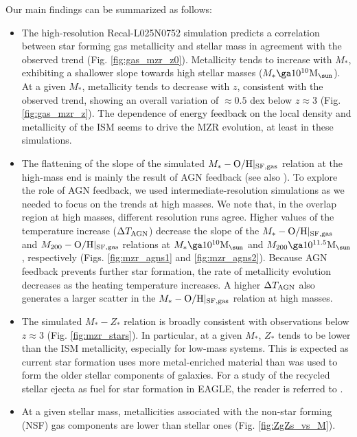 \documentclass[useAMS,usenatbib]{mn2e}
\begin{document}
Our main findings can be summarized as follows:

\begin{itemize}
\item The high-resolution Recal-L025N0752 simulation predicts a correlation between
star forming gas metallicity and stellar mass in 
agreement with the observed trend (Fig. \ref{fig:gas_mzr_z0}).  
Metallicity tends to increase with
$M_*$, exhibiting a shallower slope towards high stellar masses ($M_* \ga 10^{10} {\rm M}_{\sun}$). 
At a given $M_*$, metallicity tends to decrease with $z$, consistent with the observed
trend, showing an overall variation of $\approx 0.5$ dex below $z\approx 3$ (Fig. \ref{fig:gas_mzr_z}).
The dependence of energy feedback on the local density and metallicity of the ISM seems to drive
the MZR evolution, at least in these simulations.
\item The flattening of the slope of the simulated $M_* - {\rm O/H}|_{\rm SF,gas}$ relation at the high-mass end 
is mainly the result of AGN feedback (see also \citealt{segers2016b}). 
To explore the role of AGN feedback, we used intermediate-resolution simulations
as we needed to focus on the trends at high masses. We note that, in the
overlap region at high masses, different resolution runs agree.
Higher values of the temperature increase ($\Delta T_{\rm AGN}$) decrease the slope of the 
$M_* - {\rm O/H}|_{\rm SF,gas}$ and $M_{200} - {\rm O/H}|_{\rm SF,gas}$ relations 
at  $M_* \ga 10^{10} {\rm M}_{\sun}$ and $M_{200} \ga 10^{11.5} {\rm M}_{\sun}$, respectively 
(Figs. \ref{fig:mzr_agns1} and \ref{fig:mzr_agns2}).
Because AGN feedback prevents further star formation, the rate of metallicity evolution decreases 
as the heating temperature increases. A higher $\Delta T_{\rm AGN}$ also generates a larger
scatter in the  $M_* - {\rm O/H}|_{\rm SF,gas}$ relation at high masses.
\item The simulated $M_* - Z_*$ relation is broadly consistent with
observations below $z \approx 3$ (Fig. \ref{fig:mzr_stars}).  In particular,  at a given $M_*$, $Z_*$ tends to be lower
than the ISM metallicity, especially for low-mass systems.  This is expected as
current star formation uses more metal-enriched material than was used to form the
older stellar components of galaxies.  For a study of the recycled stellar ejecta as fuel 
for star formation in {\sc EAGLE}, the reader is referred to \citet{segers2016b}.
\item At a given stellar mass, metallicities associated with the non-star forming (NSF) gas components 
are lower than stellar ones (Fig. \ref{fig:ZgZs_vs_M}).  

\end{itemize}
\end{document}
